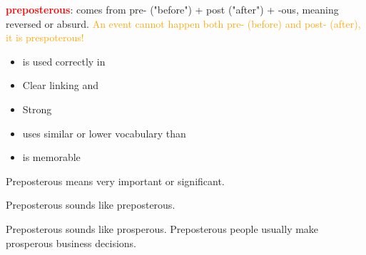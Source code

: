 \begin{figure*}[htb]
\centering
\footnotesize
\begin{minipage}{0.66\textwidth}
    \begin{tcolorbox}[goodbox, title=Good Mnemonic]
        \textcolor{red}{\textbf{preposterous}}: \textcolor{goodgreen}{comes from pre- ("before") + post ("after") + -ous}, meaning reversed or absurd. \textcolor{orange}{An event cannot happen both pre- (before) and post- (after), it is prespoterous!}
    \end{tcolorbox}
\end{minipage}
\hspace{0.5em}
\begin{minipage}{0.3\textwidth}
    \begin{itemize}[leftmargin=*, nosep]
        \item \vocab is used correctly in \mnem
        \item Clear \assoc linking \vocab and \mnem
        \item Strong \assoc
        \item \mnem uses similar or lower vocabulary than \vocab
        \item \mnem is memorable
    \end{itemize}
\end{minipage}

\vspace{0.3cm}

\begin{minipage}{0.33\textwidth}
    \begin{tcolorbox}[badbox, title=Incorrect Definition]
        Preposterous means very important or significant.
    \end{tcolorbox}
\end{minipage}%
\begin{minipage}{0.33\textwidth}
    \begin{tcolorbox}[badbox, title=Circular Association]
        Preposterous sounds like preposterous.
    \end{tcolorbox}
\end{minipage}%
\begin{minipage}{0.33\textwidth}
    \begin{tcolorbox}[badbox, title=Weak Association]
        Preposterous sounds like prosperous. Preposterous people usually make prosperous business decisions.
    \end{tcolorbox}
\end{minipage}


\end{figure*}
